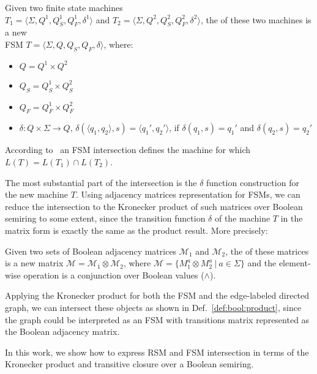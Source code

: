 \begin{definition}
\label{def:fsm:intersection}
Given two finite state machines \\
$T_1 = \langle \Sigma, Q^1, Q_S^1, Q_F^1, \delta^1 \rangle$ and $T_2 = \langle \Sigma, Q^2, Q_S^2, Q_F^2, \delta^2 \rangle$, the  of these two machines is a new 
\\ FSM $T = \langle \Sigma, Q, Q_S, Q_F, \delta \rangle$, where:
\begin{itemize}
    \item $Q = Q^1 \times Q^2$
    \item $Q_S = Q_S^1 \times Q_S^2$
    \item $Q_F = Q_F^1 \times Q_F^2$
    \item $\delta: Q \times \Sigma \to Q$,
    $\delta (\langle q_1, q_2 \rangle, s) = \langle q_1', q_2' \rangle$, if $\delta(q_1,s)=q_1'$ and $\delta(q_2,s)=q_2'$
\end{itemize}
\end{definition}

According to~\cite{automata:theory:10.5555/1177300} an FSM intersection defines the machine for which $L(T) = L(T_1) \cap L(T_2)$.

The most substantial part of the intersection is the $\delta$ function construction for the new machine $T$.
Using adjacency matrices representation for FSMs, we can reduce the intersection to the Kronecker product of such matrices over Boolean semiring to some extent, since the transition function $\delta$ of the machine $T$ in the matrix form is exactly the same as the product result.
More precisely:

\begin{definition}
\label{def:bool:product}
Given two sets of Boolean adjacency matrices $\mathcal{M}_1$ and $\mathcal{M}_2$, the  of these matrices is a new matrix
$\mathcal{M} = \mathcal{M}_1 \otimes \mathcal{M}_2$, where $\mathcal{M} = \{ M_1^a \otimes M_2^a~|~a \in \Sigma \}$ and the element-wise operation is a conjunction over Boolean values ($\wedge$).
\end{definition}

Applying the Kronecker product for both the FSM and the edge-labeled directed graph, we can intersect these objects as shown in Def.~\ref{def:bool:product}, since the graph could be interpreted as an FSM with transitions matrix represented as the Boolean adjacency matrix.

In this work, we show how to express RSM and FSM intersection in terms of
the Kronecker product and transitive closure over a Boolean semiring.